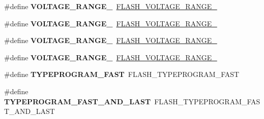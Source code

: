 \begin{DoxyCompactItemize}
\item 
\#define {\bfseries V\+O\+L\+T\+A\+G\+E\+\_\+\+R\+A\+N\+G\+E\+\_}~\hyperlink{group___f_l_a_s_h_ex___voltage___range_ga5cadf49a63c968cde3b980e5139d398e}{F\+L\+A\+S\+H\+\_\+\+V\+O\+L\+T\+A\+G\+E\+\_\+\+R\+A\+N\+G\+E\+\_}\hypertarget{group___h_a_l___f_l_a_s_h___aliased___defines_ga5a1b1ceafccd5ab37c7cfbebc9527329}{}\label{group___h_a_l___f_l_a_s_h___aliased___defines_ga5a1b1ceafccd5ab37c7cfbebc9527329}

\item 
\#define {\bfseries V\+O\+L\+T\+A\+G\+E\+\_\+\+R\+A\+N\+G\+E\+\_}~\hyperlink{group___f_l_a_s_h_ex___voltage___range_gad047be2bc7aa9be946b5b0c6b3062ef3}{F\+L\+A\+S\+H\+\_\+\+V\+O\+L\+T\+A\+G\+E\+\_\+\+R\+A\+N\+G\+E\+\_}\hypertarget{group___h_a_l___f_l_a_s_h___aliased___defines_ga1c0639cea187d17c4dad607fe124a94f}{}\label{group___h_a_l___f_l_a_s_h___aliased___defines_ga1c0639cea187d17c4dad607fe124a94f}

\item 
\#define {\bfseries V\+O\+L\+T\+A\+G\+E\+\_\+\+R\+A\+N\+G\+E\+\_}~\hyperlink{group___f_l_a_s_h_ex___voltage___range_ga50950407a789684eec9216f49e0831a0}{F\+L\+A\+S\+H\+\_\+\+V\+O\+L\+T\+A\+G\+E\+\_\+\+R\+A\+N\+G\+E\+\_}\hypertarget{group___h_a_l___f_l_a_s_h___aliased___defines_ga45c6cc06a75f9dfd18e3d182cbe1387b}{}\label{group___h_a_l___f_l_a_s_h___aliased___defines_ga45c6cc06a75f9dfd18e3d182cbe1387b}

\item 
\#define {\bfseries V\+O\+L\+T\+A\+G\+E\+\_\+\+R\+A\+N\+G\+E\+\_}~\hyperlink{group___f_l_a_s_h_ex___voltage___range_gabf8037a482f18815c5a67f287223a658}{F\+L\+A\+S\+H\+\_\+\+V\+O\+L\+T\+A\+G\+E\+\_\+\+R\+A\+N\+G\+E\+\_}\hypertarget{group___h_a_l___f_l_a_s_h___aliased___defines_ga98497e19f090f03d71a1537fbcfebfe9}{}\label{group___h_a_l___f_l_a_s_h___aliased___defines_ga98497e19f090f03d71a1537fbcfebfe9}

\item 
\#define {\bfseries T\+Y\+P\+E\+P\+R\+O\+G\+R\+A\+M\+\_\+\+F\+A\+ST}~F\+L\+A\+S\+H\+\_\+\+T\+Y\+P\+E\+P\+R\+O\+G\+R\+A\+M\+\_\+\+F\+A\+ST\hypertarget{group___h_a_l___f_l_a_s_h___aliased___defines_gae3b03b62939464528d8a52b034135ea2}{}\label{group___h_a_l___f_l_a_s_h___aliased___defines_gae3b03b62939464528d8a52b034135ea2}

\item 
\#define {\bfseries T\+Y\+P\+E\+P\+R\+O\+G\+R\+A\+M\+\_\+\+F\+A\+S\+T\+\_\+\+A\+N\+D\+\_\+\+L\+A\+ST}~F\+L\+A\+S\+H\+\_\+\+T\+Y\+P\+E\+P\+R\+O\+G\+R\+A\+M\+\_\+\+F\+A\+S\+T\+\_\+\+A\+N\+D\+\_\+\+L\+A\+ST\hypertarget{group___h_a_l___f_l_a_s_h___aliased___defines_gab52dbb436e471071f4700f9bafcb0cef}{}\label{group___h_a_l___f_l_a_s_h___aliased___defines_gab52dbb436e471071f4700f9bafcb0cef}


\end{DoxyCompactItemize}
